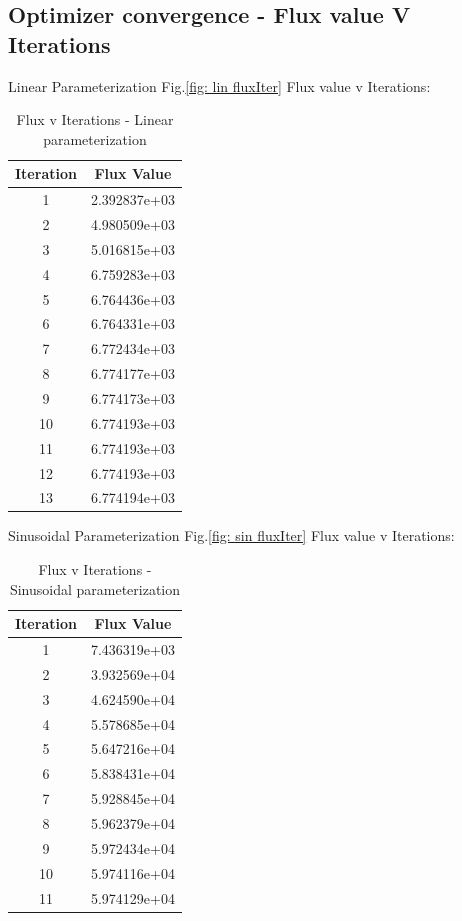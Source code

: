 \documentclass{article}
\begin{document}
\begin{appendix}
\subsection{Optimizer convergence - Flux value V Iterations}
Linear Parameterization Fig.\ref{fig: lin fluxIter} Flux value v Iterations: \\
\begin{table}[H]
\centering
\begin{tabular}{|c|c|}
\hline
Iteration & Flux Value \\
\hline
1 & 2.392837e+03 \\
2 & 4.980509e+03 \\
3 & 5.016815e+03 \\
4 & 6.759283e+03 \\
5 & 6.764436e+03 \\
6 & 6.764331e+03 \\
7 & 6.772434e+03 \\
8 & 6.774177e+03 \\
9 & 6.774173e+03 \\
10 & 6.774193e+03 \\
11 & 6.774193e+03 \\
12 & 6.774193e+03 \\
13 & 6.774194e+03 \\
\hline
\end{tabular}
\caption{Flux v Iterations - Linear parameterization}
\end{table}

Sinusoidal Parameterization Fig.\ref{fig: sin fluxIter} Flux value v Iterations: \\
\begin{table}[H]
\centering
\begin{tabular}{|c|c|}
\hline
Iteration & Flux Value \\
\hline
1 & 7.436319e+03 \\
2 & 3.932569e+04 \\
3 & 4.624590e+04 \\
4 & 5.578685e+04 \\
5 & 5.647216e+04 \\
6 & 5.838431e+04 \\
7 & 5.928845e+04 \\
8 & 5.962379e+04 \\
9 & 5.972434e+04 \\
10 & 5.974116e+04 \\
11 & 5.974129e+04 \\
\hline
\end{tabular}
\caption{Flux v Iterations - Sinusoidal parameterization}
\end{table} 


\end{appendix}
\end{document}

